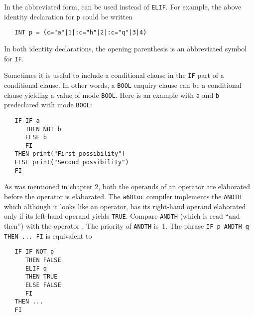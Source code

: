In the abbreviated form,  can be used
instead of \verb|ELIF|.  For example, the above identity declaration
for \verb|p| could be written
\begin{verbatim}
   INT p = (c="a"|1|:c="h"|2|:c="q"|3|4)
\end{verbatim}
\noindent
In both identity declarations, the opening parenthesis is an
abbreviated symbol for \verb|IF|.

Sometimes it is useful to include a conditional clause in the
\verb|IF| part of a conditional clause. In other words, a \verb|BOOL|
enquiry clause can be a conditional clause yielding a value of mode
\verb|BOOL|. Here is an example with \verb|a| and \verb|b|
predeclared with mode \verb|BOOL|:
\begin{verbatim}
   IF IF a
      THEN NOT b
      ELSE b
      FI
   THEN print("First possibility")
   ELSE print("Second possibility")
   FI
\end{verbatim}

As was mentioned in chapter 2, both the operands of an operator are
elaborated before the operator is elaborated. The \verb|a68toc| compiler
implements the  \verb|ANDTH| which although it
looks like an operator, has its right-hand operand elaborated only if
its left-hand operand yields \verb|TRUE|. Compare \verb|ANDTH| (which
is read ``and then'') with the operator .  The priority of
\verb|ANDTH| is~1. The phrase \verb|IF p ANDTH q THEN ... FI| is
equivalent to
\begin{verbatim}
   IF IF NOT p
      THEN FALSE
      ELIF q
      THEN TRUE
      ELSE FALSE
      FI
   THEN ...
   FI
\end{verbatim}

